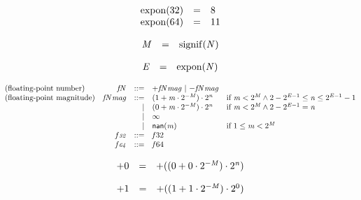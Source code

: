 $$
\begin{array}{@{}lcl@{}l@{}}
{\mathrm{expon}}(32) &=& 8 &  \\
{\mathrm{expon}}(64) &=& 11 &  \\
\end{array}
$$

$$
\begin{array}{@{}lcl@{}l@{}}
{\mathit{M}} &=& {\mathrm{signif}}({\mathit{N}}) &  \\
\end{array}
$$

$$
\begin{array}{@{}lcl@{}l@{}}
{\mathit{E}} &=& {\mathrm{expon}}({\mathit{N}}) &  \\
\end{array}
$$

$$
\begin{array}{@{}lrrl@{}l@{}}
\mbox{(floating-point number)} & {{\mathit{f}}}{{\mathit{N}}} &::=& {+{{{\mathit{f}}}{{\mathit{N}}}}{{\mathit{mag}}}} ~|~ {-{{{\mathit{f}}}{{\mathit{N}}}}{{\mathit{mag}}}} \\
\mbox{(floating-point magnitude)} & {{{\mathit{f}}}{{\mathit{N}}}}{{\mathit{mag}}} &::=& (1 + {\mathit{m}} \cdot {2^{{-{\mathit{M}}}}}) \cdot {2^{{\mathit{n}}}} &\quad
  \mbox{if}~{\mathit{m}} < {2^{{\mathit{M}}}} \land 2 - {2^{{\mathit{E}} - 1}} \leq {\mathit{n}} \leq {2^{{\mathit{E}} - 1}} - 1 \\ &&|&
(0 + {\mathit{m}} \cdot {2^{{-{\mathit{M}}}}}) \cdot {2^{{\mathit{n}}}} &\quad
  \mbox{if}~{\mathit{m}} < {2^{{\mathit{M}}}} \land 2 - {2^{{\mathit{E}} - 1}} = {\mathit{n}} \\ &&|&
\infty \\ &&|&
{\mathsf{nan}}{({\mathit{m}})} &\quad
  \mbox{if}~1 \leq {\mathit{m}} < {2^{{\mathit{M}}}} \\
& {\mathit{f{\scriptstyle32}}} &::=& {{\mathit{f}}}{32} \\
& {\mathit{f{\scriptstyle64}}} &::=& {{\mathit{f}}}{64} \\
\end{array}
$$

$$
\begin{array}{@{}lcl@{}l@{}}
{+0} &=& {+((0 + 0 \cdot {2^{{-{\mathit{M}}}}}) \cdot {2^{{\mathit{n}}}})} &  \\
\end{array}
$$

$$
\begin{array}{@{}lcl@{}l@{}}
{+1} &=& {+((1 + 1 \cdot {2^{{-{\mathit{M}}}}}) \cdot {2^{0}})} &  \\
\end{array}
$$

